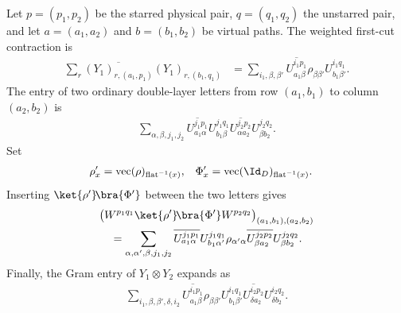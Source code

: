 \begin{lemma}
    \label{thm:mpu_source_v_four_u_expansions}
    \leanok
    Let $p=(p_1,p_2)$ be the starred physical pair,
    $q=(q_1,q_2)$ the unstarred pair, and let $a=(a_1,a_2)$ and
    $b=(b_1,b_2)$ be virtual paths. The weighted first-cut contraction is
    \begin{align}
        \sum_r \overline{(Y_1)_{r,(a_1,p_1)}}(Y_1)_{r,(b_1,q_1)}
         & =\sum_{i_1,\beta,\beta'}
        \overline{U^{i_1p_1}_{a_1\beta}}
        \rho_{\beta\beta'}U^{i_1q_1}_{b_1\beta'}.
    \end{align}
    The entry of two ordinary double-layer letters from row $(a_1,b_1)$ to
    column $(a_2,b_2)$ is
    \begin{align}
        \sum_{\alpha,\beta,j_1,j_2}
        \overline{U^{j_1p_1}_{a_1\alpha}}
        U^{j_1q_1}_{b_1\beta}
        \overline{U^{j_2p_2}_{\alpha a_2}}
        U^{j_2q_2}_{\beta b_2}.
    \end{align}
    Set
    \begin{align}
        \rho'_x & =\operatorname{vec}(\rho)_{\operatorname{flat}^{-1}(x)},  &
        \Phi'_x & =\operatorname{vec}(\Id_D)_{\operatorname{flat}^{-1}(x)}.
    \end{align}
    Inserting $\ket{\rho'}\!\bra{\Phi'}$ between the two letters gives
    \begin{align}
         & \bigl(W^{p_1q_1}\ket{\rho'}\!\bra{\Phi'}W^{p_2q_2}\bigr)
        _{(a_1,b_1),(a_2,b_2)}                                      \\
         & \quad=\sum_{\alpha,\alpha',\beta,j_1,j_2}
        \overline{U^{j_1p_1}_{a_1\alpha}}
        U^{j_1q_1}_{b_1\alpha'}\rho_{\alpha'\alpha}
        \overline{U^{j_2p_2}_{\beta a_2}}U^{j_2q_2}_{\beta b_2}.
    \end{align}
    Finally, the Gram entry of $Y_1\otimes Y_2$ expands as
    \begin{align}
        \sum_{i_1,\beta,\beta',\delta,i_2}
        \overline{U^{i_1p_1}_{a_1\beta}}
        \rho_{\beta\beta'}U^{i_1q_1}_{b_1\beta'}
        \overline{U^{i_2p_2}_{\delta a_2}}
        U^{i_2q_2}_{\delta b_2}.
    \end{align}
\end{lemma}

